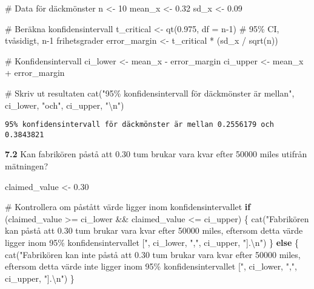 \documentclass[
  letterpaper,
  DIV=11,
  numbers=noendperiod]{scrartcl}
\newenvironment{Shaded}{\begin{snugshade}}{\end{snugshade}}
\newcommand{\AttributeTok}[1]{\textcolor[rgb]{0.40,0.45,0.13}{#1}}
\newcommand{\CommentTok}[1]{\textcolor[rgb]{0.37,0.37,0.37}{#1}}
\newcommand{\ControlFlowTok}[1]{\textcolor[rgb]{0.00,0.23,0.31}{\textbf{#1}}}
\newcommand{\DecValTok}[1]{\textcolor[rgb]{0.68,0.00,0.00}{#1}}
\newcommand{\FloatTok}[1]{\textcolor[rgb]{0.68,0.00,0.00}{#1}}
\newcommand{\FunctionTok}[1]{\textcolor[rgb]{0.28,0.35,0.67}{#1}}
\newcommand{\NormalTok}[1]{\textcolor[rgb]{0.00,0.23,0.31}{#1}}
\newcommand{\OtherTok}[1]{\textcolor[rgb]{0.00,0.23,0.31}{#1}}
\newcommand{\SpecialCharTok}[1]{\textcolor[rgb]{0.37,0.37,0.37}{#1}}
\newcommand{\StringTok}[1]{\textcolor[rgb]{0.13,0.47,0.30}{#1}}
\begin{document}
\begin{Shaded}
\begin{Highlighting}[]
\CommentTok{\# Data för däckmönster}
\NormalTok{n }\OtherTok{\textless{}{-}} \DecValTok{10}
\NormalTok{mean\_x }\OtherTok{\textless{}{-}} \FloatTok{0.32}
\NormalTok{sd\_x }\OtherTok{\textless{}{-}} \FloatTok{0.09}

\CommentTok{\# Beräkna konfidensintervall}
\NormalTok{t\_critical }\OtherTok{\textless{}{-}} \FunctionTok{qt}\NormalTok{(}\FloatTok{0.975}\NormalTok{, }\AttributeTok{df =}\NormalTok{ n}\DecValTok{{-}1}\NormalTok{) }\CommentTok{\# 95\% CI, tvåsidigt, n{-}1 frihetsgrader}
\NormalTok{error\_margin }\OtherTok{\textless{}{-}}\NormalTok{ t\_critical }\SpecialCharTok{*}\NormalTok{ (sd\_x }\SpecialCharTok{/} \FunctionTok{sqrt}\NormalTok{(n))}

\CommentTok{\# Konfidensintervall}
\NormalTok{ci\_lower }\OtherTok{\textless{}{-}}\NormalTok{ mean\_x }\SpecialCharTok{{-}}\NormalTok{ error\_margin}
\NormalTok{ci\_upper }\OtherTok{\textless{}{-}}\NormalTok{ mean\_x }\SpecialCharTok{+}\NormalTok{ error\_margin}

\CommentTok{\# Skriv ut resultaten}
\FunctionTok{cat}\NormalTok{(}\StringTok{"95\% konfidensintervall för däckmönster är mellan"}\NormalTok{, ci\_lower, }\StringTok{"och"}\NormalTok{, ci\_upper, }\StringTok{"}\SpecialCharTok{\textbackslash{}n}\StringTok{"}\NormalTok{)}
\end{Highlighting}
\end{Shaded}

\begin{verbatim}
95% konfidensintervall för däckmönster är mellan 0.2556179 och 0.3843821 
\end{verbatim}

\textbf{7.2} Kan fabrikören påstå att 0.30 tum brukar vara kvar efter
50000 miles utifrån mätningen?

\begin{Shaded}
\begin{Highlighting}[]
\NormalTok{claimed\_value }\OtherTok{\textless{}{-}} \FloatTok{0.30}

\CommentTok{\# Kontrollera om påstått värde ligger inom konfidensintervallet}
\ControlFlowTok{if}\NormalTok{ (claimed\_value }\SpecialCharTok{\textgreater{}=}\NormalTok{ ci\_lower }\SpecialCharTok{\&\&}\NormalTok{ claimed\_value }\SpecialCharTok{\textless{}=}\NormalTok{ ci\_upper) \{}
  \FunctionTok{cat}\NormalTok{(}\StringTok{"Fabrikören kan påstå att 0.30 tum brukar vara kvar efter 50000 miles,}
\StringTok{  eftersom detta värde ligger inom 95\% konfidensintervallet ["}\NormalTok{, ci\_lower, }\StringTok{","}\NormalTok{, ci\_upper, }\StringTok{"].}\SpecialCharTok{\textbackslash{}n}\StringTok{"}\NormalTok{)}
\NormalTok{\} }\ControlFlowTok{else}\NormalTok{ \{}
  \FunctionTok{cat}\NormalTok{(}\StringTok{"Fabrikören kan inte påstå att 0.30 tum brukar vara kvar efter 50000 miles,}
\StringTok{  eftersom detta värde inte ligger inom 95\% konfidensintervallet ["}\NormalTok{, ci\_lower, }\StringTok{","}\NormalTok{, ci\_upper, }\StringTok{"].}\SpecialCharTok{\textbackslash{}n}\StringTok{"}\NormalTok{)}
\NormalTok{\}}
\end{Highlighting}
\end{Shaded}
\end{document}
